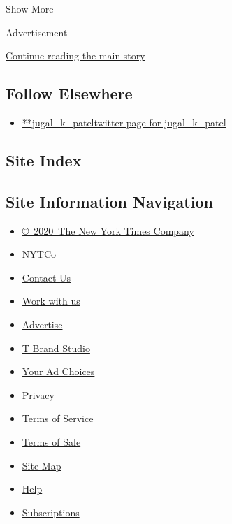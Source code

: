 Show More

Advertisement

\protect\hyperlink{after-mid2}{Continue reading the main story}

\hypertarget{follow-elsewhere}{%
\subsection{Follow Elsewhere}\label{follow-elsewhere}}

\begin{itemize}
\tightlist
\item
  \href{https://twitter.com/jugal_k_patel}{**jugal\_k\_pateltwitter page
  for jugal\_k\_patel}
\end{itemize}

\hypertarget{site-index}{%
\subsection{Site Index}\label{site-index}}

\hypertarget{site-information-navigation}{%
\subsection{Site Information
Navigation}\label{site-information-navigation}}

\begin{itemize}
\tightlist
\item
  \href{https://help.nytimes3xbfgragh.onion/hc/en-us/articles/115014792127-Copyright-notice}{©~2020~The
  New York Times Company}
\end{itemize}

\begin{itemize}
\tightlist
\item
  \href{https://www.nytco.com/}{NYTCo}
\item
  \href{https://help.nytimes3xbfgragh.onion/hc/en-us/articles/115015385887-Contact-Us}{Contact
  Us}
\item
  \href{https://www.nytco.com/careers/}{Work with us}
\item
  \href{https://nytmediakit.com/}{Advertise}
\item
  \href{http://www.tbrandstudio.com/}{T Brand Studio}
\item
  \href{https://www.nytimes3xbfgragh.onion/privacy/cookie-policy\#how-do-i-manage-trackers}{Your
  Ad Choices}
\item
  \href{https://www.nytimes3xbfgragh.onion/privacy}{Privacy}
\item
  \href{https://help.nytimes3xbfgragh.onion/hc/en-us/articles/115014893428-Terms-of-service}{Terms
  of Service}
\item
  \href{https://help.nytimes3xbfgragh.onion/hc/en-us/articles/115014893968-Terms-of-sale}{Terms
  of Sale}
\item
  \href{https://spiderbites.nytimes3xbfgragh.onion}{Site Map}
\item
  \href{https://help.nytimes3xbfgragh.onion/hc/en-us}{Help}
\item
  \href{https://www.nytimes3xbfgragh.onion/subscription?campaignId=37WXW}{Subscriptions}
\end{itemize}
